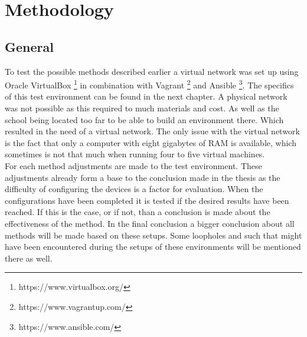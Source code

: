 
\chapter{Methodology}
\label{ch:methodologie}

\section{General}
To test the possible methods described earlier a virtual network was set up using Oracle VirtualBox \footnote{ https://www.virtualbox.org/} in combination with Vagrant \footnote{https://www.vagrantup.com/} and Ansible \footnote{https://www.ansible.com/}. The specifics of this test environment can be found in the next chapter. A physical network was not possible as this required to much materials and cost. As well as the school being located too far to be able to build an environment there. Which resulted in the need of a virtual network. The only issue with the virtual network is the fact that only a computer with eight gigabytes of RAM is available, which sometimes is not that much when running four to five virtual machines.\\

For each method adjustments are made to the test environment. These adjustments already form a base to the conclusion made in the thesis as the difficulty of configuring the devices is a factor for evaluation. When the configurations have been completed it is tested if the desired results have been reached. If this is the case, or if not, than a conclusion is made about the effectiveness of the method. In the final conclusion a bigger conclusion about all methods will be made based on these setups. Some loopholes and such that might have been encountered during the setups of these environments will be mentioned there as well.\\
